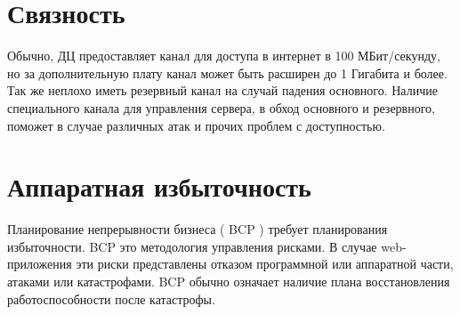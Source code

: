 
\section{ Связность } \label{sect2_17}

Обычно, ДЦ предоставляет канал для доступа в интернет в 100 МБит/секунду, но за дополнительную плату канал может быть расширен до 1 Гигабита и более. Так же неплохо иметь резервный канал на случай падения основного. Наличие специального канала для управления сервера, в обход основного и резервного, поможет в случае различных атак и прочих проблем с доступностью.

\section{ Аппаратная избыточность } \label{sect2_18}

Планирование непрерывности бизнеса ( BCP ) требует планирования избыточности. BCP это методология управления рисками. В случае web-приложения эти риски представлены отказом программной или аппаратной части, атаками или катастрофами. BCP обычно означает наличие плана восстановления работоспособности после катастрофы.



































\clearpage


